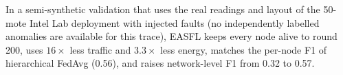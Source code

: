 In a semi-synthetic validation that uses the real readings and layout of the 50-mote
Intel Lab deployment with injected faults (no independently labelled anomalies are
available for this trace), EASFL keeps every node alive to round 200, uses $16\times$ less
traffic and $3.3\times$ less energy, matches the per-node F1 of hierarchical FedAvg (0.56),
and raises network-level F1 from 0.32 to 0.57.
